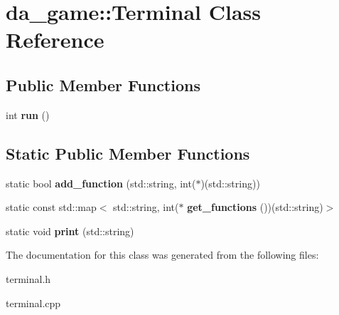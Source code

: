 \hypertarget{classda__game_1_1Terminal}{
\section{da\_\-game::Terminal Class Reference}
\label{classda__game_1_1Terminal}
}
\subsection*{Public Member Functions}
\begin{DoxyCompactItemize}
\item 
\hypertarget{classda__game_1_1Terminal_a2332b0a1f5af08b26d0a6ab6995af624}{
int {\bfseries run} ()}
\label{classda__game_1_1Terminal_a2332b0a1f5af08b26d0a6ab6995af624}

\end{DoxyCompactItemize}
\subsection*{Static Public Member Functions}
\begin{DoxyCompactItemize}
\item 
\hypertarget{classda__game_1_1Terminal_ae04f49aa880c92ab3046e38bffda825e}{
static bool {\bfseries add\_\-function} (std::string, int($\ast$)(std::string))}
\label{classda__game_1_1Terminal_ae04f49aa880c92ab3046e38bffda825e}

\item 
\hypertarget{classda__game_1_1Terminal_ab97f45258ad52ebdf946a2e0a9434c66}{
static const std::map$<$ std::string, int($\ast$ {\bfseries get\_\-functions} ())(std::string)$>$}
\label{classda__game_1_1Terminal_ab97f45258ad52ebdf946a2e0a9434c66}

\item 
\hypertarget{classda__game_1_1Terminal_a5d545f56be7d990ce0c77a2fe8cd5042}{
static void {\bfseries print} (std::string)}
\label{classda__game_1_1Terminal_a5d545f56be7d990ce0c77a2fe8cd5042}

\end{DoxyCompactItemize}


The documentation for this class was generated from the following files:\begin{DoxyCompactItemize}
\item 
terminal.h\item 
terminal.cpp\end{DoxyCompactItemize}
